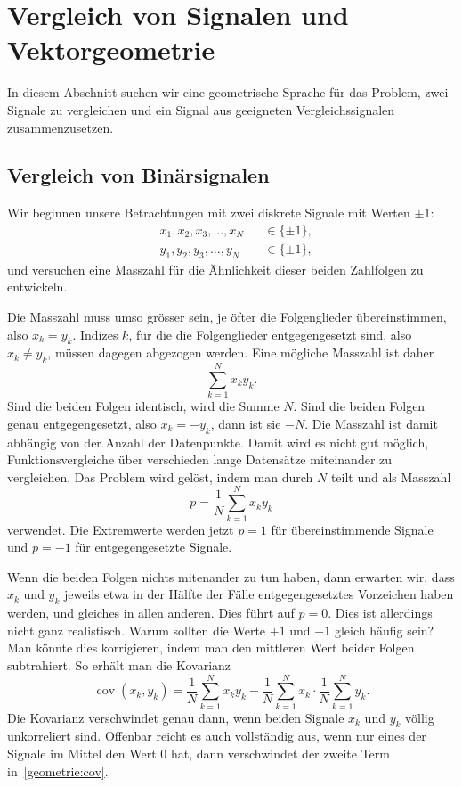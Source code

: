 %
%
%
\section{Vergleich von Signalen und Vektorgeometrie
\label{section:vergleich}}
In diesem Abschnitt suchen wir eine geometrische Sprache für das
Problem, zwei Signale zu vergleichen und ein Signal aus geeigneten
Vergleichssignalen zusammenzusetzen.

\subsection{Vergleich von Binärsignalen}
Wir beginnen unsere Betrachtungen mit zwei diskrete Signale mit Werten $\pm 1$:
\begin{align*}
&x_1,x_2,x_3,\dots,x_N &&\in \{\pm 1\},
\\
&y_1,y_2,y_3,\dots,y_N &&\in \{\pm 1\},
\end{align*}
und versuchen eine Masszahl für die Ähnlichkeit dieser beiden
Zahlfolgen zu entwickeln.

Die Masszahl muss umso grösser sein, je öfter die Folgenglieder
übereinstimmen, also $x_k=y_k$.
Indizes $k$, für die die Folgenglieder entgegengesetzt sind, also
$x_k\ne y_k$, müssen dagegen abgezogen werden.
Eine mögliche Masszahl ist daher 
\[
\sum_{k=1}^N x_ky_k.
\]
Sind die beiden Folgen identisch, wird die Summe $N$.
Sind die beiden Folgen genau entgegengesetzt, also $x_k=-y_k$, dann ist
sie $-N$.
Die Masszahl ist damit abhängig von der Anzahl der Datenpunkte.
Damit wird es nicht gut möglich, Funktionsvergleiche über verschieden
lange Datensätze miteinander zu vergleichen.
Das Problem wird gelöst, indem man durch $N$ teilt und als Masszahl
\[
p=\frac{1}{N} \sum_{k=1}^N x_ky_k
\]
verwendet.
Die Extremwerte werden jetzt $p=1$ für übereinstimmende Signale und
$p=-1$ für entgegengesetzte Signale.

Wenn die beiden Folgen nichts mitenander zu tun haben, dann erwarten
wir, dass $x_k$ und $y_k$ jeweils etwa in der Hälfte der Fälle
entgegengesetztes Vorzeichen haben werden, und gleiches in allen
anderen.
Dies führt auf $p=0$.
Dies ist allerdings nicht ganz realistisch.
Warum sollten die Werte $+1$ und $-1$ gleich häufig sein?
Man könnte dies korrigieren, indem man den mittleren Wert beider Folgen
subtrahiert.
So erhält man die Kovarianz
\begin{equation}
\operatorname{cov}(x_k,y_k)
=
\frac1{N} \sum_{k=1}^N x_ky_k
-
\frac1{N} \sum_{k=1}^N x_k
\cdot
\frac1{N} \sum_{k=1}^N y_k.
\label{geometrie:cov}
\end{equation}
Die Kovarianz verschwindet genau dann, wenn beiden Signale $x_k$ und $y_k$
völlig unkorreliert sind.
Offenbar reicht es auch vollständig aus, wenn nur eines der Signale
im Mittel den Wert $0$ hat, dann verschwindet der zweite Term
in~\eqref{geometrie:cov}.


